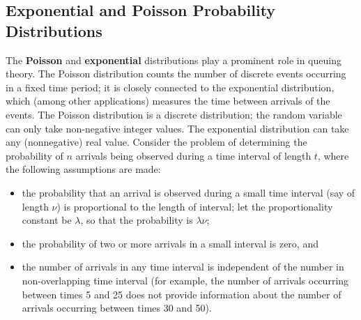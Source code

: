 \subsection{Exponential and Poisson Probability Distributions}
The \textbf{Poisson} and \textbf{exponential} distributions play a prominent role in queuing theory. The Poisson distribution counts the number of discrete events occurring in a fixed time period; it is closely connected to the exponential distribution, which (among other applications) measures the time between arrivals of the events. The Poisson distribution is a discrete distribution; the random variable can only take non-negative integer values. The exponential distribution can take any (nonnegative) real value.
\newl Consider the problem of determining the probability of $n$ arrivals being observed during a time interval of length $t$, where the following assumptions are made:
\begin{itemize}[noitemsep]
\item the probability that an arrival is observed during a small time interval (say of length $\nu$) is proportional to the length of interval; let the proportionality constant be $\lambda$, so that the probability is $\lambda\nu$;
\item the probability of two or more arrivals in a small interval is zero, and 
\item the number of arrivals in any time interval is independent of the number in non-overlapping time interval (for example, the number of arrivals occurring between times 5 and 25 does not provide information about the number of arrivals occurring between times 30 and 50).
\end{itemize}
